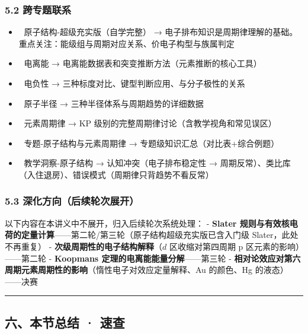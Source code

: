 \documentclass[a4paper,11pt]{ctexart}
\providecommand{\tightlist}{\setlength{\itemsep}{0pt}\setlength{\parskip}{0pt}}
\begin{document}
\subsubsection{5.2 跨专题联系}\label{ux8de8ux4e13ux9898ux8054ux7cfb}

\begin{itemize}
\tightlist
\item
  🔗 原子结构-超级充实版（自学完整） → 电子排布知识是周期律理解的基础。重点关注：能级组与周期对应关系、价电子构型与族属判定
\item
  🔗 电离能 → 电离能数据表和突变推断方法（元素推断的核心工具）
\item
  🔗 电负性 → 三种标度对比、键型判断应用、与分子极性的关系
\item
  🔗 原子半径 → 三种半径体系与周期趋势的详细数据
\item
  🔗 元素周期律 → KP 级别的完整周期律讨论（含教学视角和常见误区）
\item
  🔗 专题-原子结构与元素周期律 → 专题级知识汇总（对比表+综合例题）
\item
  🔗 教学洞察-原子结构 → 认知冲突（电子排布稳定性 → 周期反常）、类比库（入住退房）、错误模式（周期律只背趋势不看反常）
\end{itemize}

\subsubsection{5.3 深化方向（后续轮次展开）}\label{ux6df1ux5316ux65b9ux5411ux540eux7eedux8f6eux6b21ux5c55ux5f00}

以下内容在本讲义中不展开，归入后续轮次系统处理：
- \textbf{Slater 规则与有效核电荷的定量计算}------第二轮/第三轮（原子结构超级充实版已含入门级 Slater，此处不再重复）
- \textbf{次级周期性的电子结构解释}（\(d\) 区收缩对第四周期 p 区元素的影响）------第二轮
- \textbf{Koopmans 定理的电离能能量分解}------第三轮
- \textbf{相对论效应对第六周期元素周期性的影响}（惰性电子对效应定量解释、Au 的颜色、Hg 的液态）------决赛

\begin{center}\rule{0.5\linewidth}{0.5pt}\end{center}

\subsection{六、本节总结 · 速查}\label{ux516dux672cux8282ux603bux7ed3-ux901fux67e5}
\end{document}
